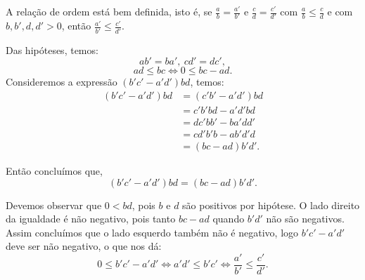 \documentclass[../main.tex]{subfiles}
\begin{document}
\begin{prop}\label{rac-prop-relOrdemBemDef}
    A relação de ordem está bem definida, isto é, se $\frac{a}{b} = \frac{a'}{b'}$ e $\frac{c}{d} = \frac{c'}{d'}$ com 
    $\frac{a}{b} \leq \frac{c}{d}$ e com $b,b',d,d' > 0$, então $\frac{a'}{b'} \leq \frac{c'}{d'}$.
\end{prop}
\begin{dem}
    Das hipóteses, temos: \\
    \[ ab' = ba',\ cd' = dc', \] 
    \[ ad \leq bc \iff 0 \leq bc-ad. \]
    Consideremos a expressão $(b'c'-a'd')bd$, temos: 
    \begin{align*}
        (b'c'-a'd')bd 
        &= (c'b'-a'd')bd  \\
        &= c'b'bd - a'd'bd \\
        &= dc'bb' - ba'dd' \\
        &= cd'b'b - ab'd'd \\
        &= (bc-ad) b'd'.     
    \end{align*}


    Então concluímos que, 
    \[ (b'c'-a'd')bd = (bc-ad) b'd'. \]

    Devemos observar que $0 < bd$, pois $b$ e $d$ são positivos por hipótese. O lado direito da igualdade é não negativo, pois 
    tanto $bc-ad$ quando $b'd'$ não são negativos. Assim concluímos que o lado esquerdo também não é negativo, logo $b'c'-a'd'$ deve ser não negativo, o que nos dá:
    \[ 0 \leq b'c'-a'd' \iff a'd' \leq b'c' \iff \frac{a'}{b'} \leq \frac{c'}{d'}. \]

    
    
    
\end{dem}
\end{document}

